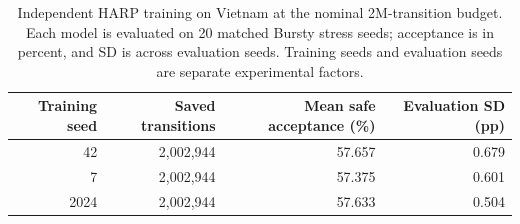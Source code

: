\documentclass[final,5p]{elsarticle}
\newcommand{\rev}[1]{\textcolor{revisiongreen}{#1}}
\let\newrev\rev
\begin{document}
\begin{table}[p]
\centering
\caption{\newrev{Independent HARP training on Vietnam at the nominal 2M-transition budget. Each model is evaluated on 20 matched Bursty stress seeds; acceptance is in percent, and SD is across evaluation seeds. Training seeds and evaluation seeds are separate experimental factors.}}
\label{tab:independent_training}
{\color{revisiongreen}
\begin{tabular}{rrrr}
\toprule
Training seed & Saved transitions & Mean safe acceptance (\%) & Evaluation SD (pp) \\
\midrule
42 & 2,002,944 & 57.657 & 0.679 \\
7 & 2,002,944 & 57.375 & 0.601 \\
2024 & 2,002,944 & 57.633 & 0.504 \\

\bottomrule
\end{tabular}}
\end{table}
\clearpage
\endgroup
\end{document}
